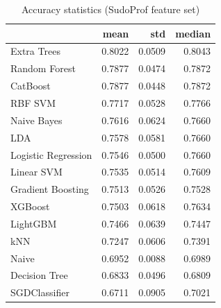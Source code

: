 \begin{table}
\caption{Accuracy statistics (SudoProf feature set)}
\label{tab:accuracy_SudoProf_stats}
\begin{tabular}{lrrr}
\toprule
 & mean & std & median \\
\midrule
Extra Trees & 0.8022 & 0.0509 & 0.8043 \\
Random Forest & 0.7877 & 0.0474 & 0.7872 \\
CatBoost & 0.7877 & 0.0448 & 0.7872 \\
RBF SVM & 0.7717 & 0.0528 & 0.7766 \\
Naive Bayes & 0.7616 & 0.0624 & 0.7660 \\
LDA & 0.7578 & 0.0581 & 0.7660 \\
Logistic Regression & 0.7546 & 0.0500 & 0.7660 \\
Linear SVM & 0.7535 & 0.0514 & 0.7609 \\
Gradient Boosting & 0.7513 & 0.0526 & 0.7528 \\
XGBoost & 0.7503 & 0.0618 & 0.7634 \\
LightGBM & 0.7466 & 0.0639 & 0.7447 \\
kNN & 0.7247 & 0.0606 & 0.7391 \\
Naive & 0.6952 & 0.0088 & 0.6989 \\
Decision Tree & 0.6833 & 0.0496 & 0.6809 \\
SGDClassifier & 0.6711 & 0.0905 & 0.7021 \\
\bottomrule
\end{tabular}
\end{table}
